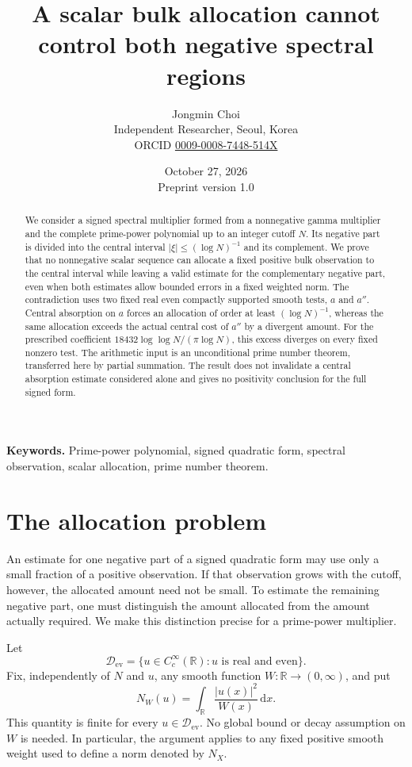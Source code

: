 \documentclass[11pt]{article}
\title{A scalar bulk allocation cannot control both negative spectral regions}
\author{Jongmin Choi\\[3pt]\small Independent Researcher, Seoul, Korea\\\small ORCID \href{https://orcid.org/0009-0008-7448-514X}{0009-0008-7448-514X}}
\date{October 27, 2026\\\small Preprint version 1.0}
\theoremstyle{remark}
\newcommand{\R}{\mathbb R}
\newcommand{\dd}{\,\mathrm d}
\newcommand{\core}{\mathcal D_{\mathrm{ev}}}
\newcommand{\NW}{N_W}
\numberwithin{equation}{section}
\begin{document}
\maketitle
\begin{abstract}
We consider a signed spectral multiplier formed from a nonnegative gamma multiplier and the complete prime-power polynomial up to an integer cutoff $N$. Its negative part is divided into the central interval $|\xi|\le(\log N)^{-1}$ and its complement. We prove that no nonnegative scalar sequence can allocate a fixed positive bulk observation to the central interval while leaving a valid estimate for the complementary negative part, even when both estimates allow bounded errors in a fixed weighted norm. The contradiction uses two fixed real even compactly supported smooth tests, $a$ and $a''$. Central absorption on $a$ forces an allocation of order at least $(\log N)^{-1}$, whereas the same allocation exceeds the actual central cost of $a''$ by a divergent amount. For the prescribed coefficient $18432\log\log N/(\pi\log N)$, this excess diverges on every fixed nonzero test. The arithmetic input is an unconditional prime number theorem, transferred here by partial summation. The result does not invalidate a central absorption estimate considered alone and gives no positivity conclusion for the full signed form.
\end{abstract}
\noindent\textbf{Keywords.} Prime-power polynomial, signed quadratic form, spectral observation, scalar allocation, prime number theorem.

\section{The allocation problem}\label{sec:problem}
An estimate for one negative part of a signed quadratic form may use only a small fraction of a positive observation. If that observation grows with the cutoff, however, the allocated amount need not be small. To estimate the remaining negative part, one must distinguish the amount allocated from the amount actually required. We make this distinction precise for a prime-power multiplier.

Let
\[
 \core=\{u\in C_c^\infty(\R):u\text{ is real and even}\}.
\]
Fix, independently of $N$ and $u$, any smooth function $W:\R\to(0,\infty)$, and put
\begin{equation}\label{eq:norm}
 \NW(u)=\int_\R\frac{|u(x)|^2}{W(x)}\dd x.
\end{equation}
This quantity is finite for every $u\in\core$. No global bound or decay assumption on $W$ is needed. In particular, the argument applies to any fixed positive smooth weight used to define a norm denoted by $N_X$.
\end{document}
